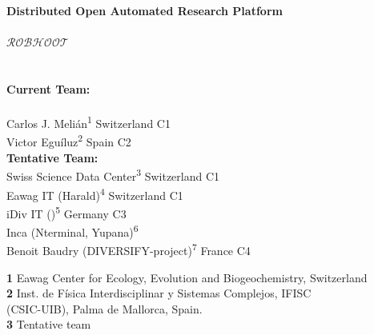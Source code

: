 \documentclass[english,12pt]{article}
\date{}
\begin{document}
\begin{flushleft}
  \textbf{\Large Distributed Open Automated Research Platform\\
    \\
    \vspace{0.5cm}
    $\mathcal{ROBHOOT}$}\\
  \\
  \\
  \vspace{0.5 in}
  {\bf Current Team:}\\
  \\
    Carlos J. Meli\'an\textsuperscript{1} Switzerland C1\\
    Victor Egu\'iluz\textsuperscript{2} Spain C2\\

    {\bf Tentative Team:}\\
    Swiss Science Data Center\textsuperscript{3} Switzerland C1\\
    Eawag IT (Harald)\textsuperscript{4} Switzerland C1\\
    iDiv IT ()\textsuperscript{5} Germany C3\\
    Inca (Nterminal, Yupana)\textsuperscript{6}\\
    Benoit Baudry (DIVERSIFY-project)\textsuperscript{7} France C4

  
  \vspace{0.5cm} 
  \textbf{1} Eawag Center for Ecology, Evolution and Biogeochemistry, Switzerland\\
  \textbf{2} Inst. de Física Interdisciplinar y Sistemas Complejos, IFISC\\
  (CSIC-UIB), Palma de Mallorca, Spain.\\
  \textbf{3} Tentative team
\\
\bigskip
\end{flushleft}
\newpage




\tableofcontents
\newpage
\end{document}
